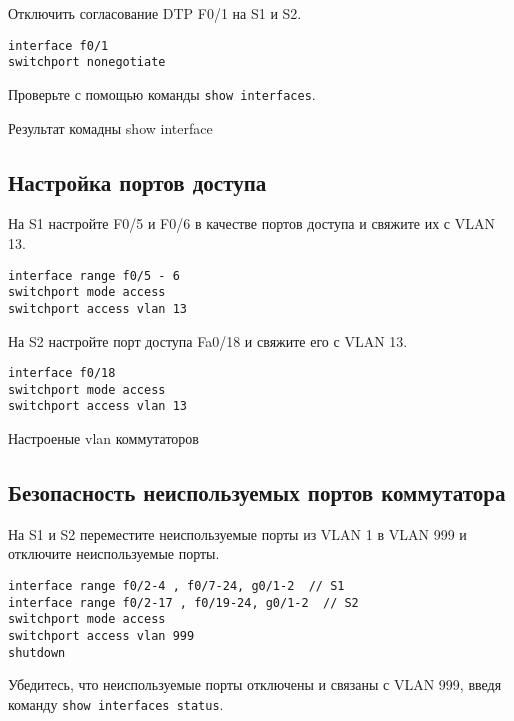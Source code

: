 Отключить согласование DTP F0/1 на S1 и S2.

\begin{verbatim}
interface f0/1
switchport nonegotiate
\end{verbatim}

Проверьте с помощью команды \texttt{show interfaces}.

\begin{image}
	\caption{Результат комадны show interface}
\end{image}

\subsection{Настройка портов доступа}

На S1 настройте F0/5 и F0/6 в качестве портов доступа и свяжите их с VLAN 13.

\begin{verbatim}
interface range f0/5 - 6
switchport mode access
switchport access vlan 13
\end{verbatim}

На S2 настройте порт доступа Fa0/18 и свяжите его с VLAN 13.

\begin{verbatim}
interface f0/18
switchport mode access
switchport access vlan 13
\end{verbatim}

\begin{image}
	\caption{Настроеные vlan коммутаторов}
\end{image}


\subsection{Безопасность неиспользуемых портов коммутатора}

На S1 и S2 переместите неиспользуемые порты из VLAN 1 в VLAN 999
и отключите неиспользуемые порты.

\begin{verbatim}
interface range f0/2-4 , f0/7-24, g0/1-2  // S1
interface range f0/2-17 , f0/19-24, g0/1-2  // S2
switchport mode access
switchport access vlan 999
shutdown
\end{verbatim}

Убедитесь, что неиспользуемые порты отключены и связаны с VLAN 999,
введя команду \texttt{show interfaces status}.

